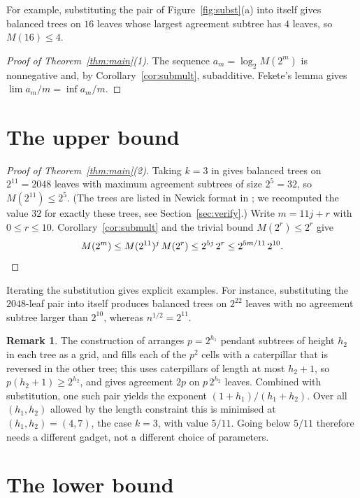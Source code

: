 \documentclass[11pt]{amsart}
\theoremstyle{definition}
\newtheorem{rem}[theorem]{Remark}
\begin{document}
For example, substituting the pair of Figure~\ref{fig:subst}(a) into itself gives balanced trees on $16$ leaves whose largest agreement subtree has $4$ leaves, so $M(16)\le4$.

\begin{proof}[Proof of Theorem~\ref{thm:main}(1)]
The sequence $a_m=\log_2 M(2^m)$ is nonnegative and, by Corollary~\ref{cor:submult},
subadditive. Fekete's lemma \cite{Fekete} gives $\lim a_m/m=\inf a_m/m$.
\end{proof}

\section{The upper bound}

\begin{proof}[Proof of Theorem~\ref{thm:main}(2)]
Taking $k=3$ in \cite[Theorem~4.6]{BLOSSW} gives balanced trees on $2^{11}=2048$ leaves with
maximum agreement subtrees of size $2^5=32$, so $M(2^{11})\le 2^5$. (The trees are listed in
Newick format in \cite[Appendix~A]{BLOSSW}; we recomputed the value $32$ for exactly these trees,
see Section~\ref{sec:verify}.) Write $m=11j+r$ with $0\le r\le 10$. Corollary~\ref{cor:submult} and
the trivial bound $M(2^r)\le 2^r$ give
\[
M(2^m)\le M(2^{11})^j\,M(2^r)\le 2^{5j}\,2^r\le 2^{5m/11}\,2^{10}.\qedhere
\]
\end{proof}

Iterating the substitution gives explicit examples. For instance, substituting the $2048$-leaf
pair into itself produces balanced trees on $2^{22}$ leaves with no agreement subtree larger
than $2^{10}$, whereas $n^{1/2}=2^{11}$.

\begin{rem}\label{rem:family}
The construction of \cite{BLOSSW} arranges $p=2^{h_1}$ pendant subtrees of height $h_2$ in each
tree as a grid, and fills each of the $p^2$ cells with a caterpillar that is reversed in the
other tree; this uses caterpillars of length at most $h_2+1$, so $p(h_2+1)\ge 2^{h_2}$, and
gives agreement $2p$ on $p\,2^{h_2}$ leaves. Combined with substitution, one such pair yields
the exponent $(1+h_1)/(h_1+h_2)$. Over all $(h_1,h_2)$ allowed by the length constraint this is
minimised at $(h_1,h_2)=(4,7)$, the case $k=3$, with value $5/11$. Going below $5/11$ therefore
needs a different gadget, not a different choice of parameters.
\end{rem}

\section{The lower bound}
\end{document}

